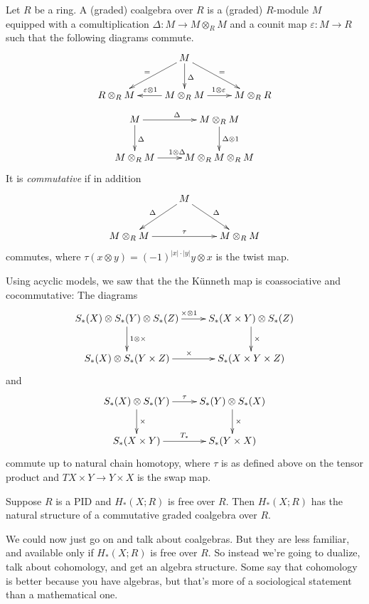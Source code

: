 \begin{definition}
Let $R$ be a ring. A (graded) coalgebra over $R$ is a (graded) $R$-module $M$ equipped with a comultiplication $\Delta:M\to M\otimes_R M$ and a counit map $\varepsilon:M\to R$ such that the following diagrams commute.
\begin{equation*}
\xymatrix{ & M\ar[d]^\Delta\ar[dr]^=\ar[dl]_= & \\
R\otimes_R M & M\otimes_R M\ar[l]_{\varepsilon\otimes 1}\ar[r]^{1\otimes\varepsilon} & M\otimes_R R}
\end{equation*}
\begin{equation*}
\xymatrix{
	M\ar[r]^{\Delta}\ar[d]^{\Delta} & M\otimes_R M\ar[d]^{\Delta\otimes 1}\\
	M\otimes_R M\ar[r]^{1\otimes\Delta} & M\otimes_R M\otimes_R M
}\end{equation*}
It is {\em commutative} if in addition
\begin{equation*}
\xymatrix{
	 & M\ar[dl]_\Delta\ar[dr]^\Delta &\\
	M\otimes_R M\ar[rr]^{\tau} & & M\otimes_R M
}\end{equation*}
commutes, where $\tau(x\otimes y)=(-1)^{|x|\cdot|y|}y\otimes x$ is the twist map.
\end{definition}

Using acyclic models, we saw that the 
the K\"{u}nneth map is coassociative and cocommutative: The diagrams
\[
\xymatrix{S_\ast(X)\otimes S_\ast(Y)\otimes S_\ast(Z) \ar[r]^{\times\otimes1}
\ar[d]^{1\otimes\times} & S_\ast(X\times Y)\otimes S_\ast(Z) \ar[d]^{\times} \\
S_\ast(X)\otimes S_\ast(Y\times Z) \ar[r]^\times & S_\ast(X\times Y\times Z)
}\]
and
\begin{equation*}
\xymatrix{S_\ast(X)\otimes S_\ast(Y)\ar[r]^{\tau}\ar[d]^{\times} & S_\ast(Y)\otimes S_\ast(X)\ar[d]^{\times}\\
S_\ast(X\times Y)\ar[r]^{T_\ast} & S_\ast(Y\times X)
}\end{equation*}
commute up to natural chain homotopy, where $\tau$ is as defined above on the tensor product and $TX\times Y\to Y\times X$ is the swap map.

\begin{corollary}
Suppose $R$ is a PID and $H_*(X;R)$ is free over $R$. 
Then $ H_\ast(X;R)$ has the natural structure of a commutative graded coalgebra over $R$.
\end{corollary}

We could now just go on and talk about coalgebras. But they are less familiar,
and available only if $H_\ast(X;R)$ is free over $R$. 
So instead we're going to dualize,
talk about cohomology, and get an algebra structure. Some say that cohomology is better because you have algebras, but that's more of a sociological statement than a mathematical one.


